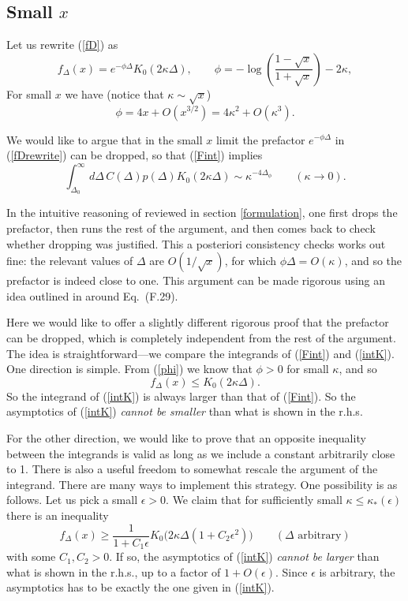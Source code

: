 \documentclass[12pt]{article}
\newcommand{\reef}[1]{(\ref{#1})}
\def\eps{\epsilon}
\newcommand{\beq}{\begin{equation}}
\newcommand{\eeq}{\end{equation}}
\def\ge{\geqslant}
\def\le{\leqslant}
\def\eps{\epsilon}
\newcommand{\D}{\Delta}
\numberwithin{equation}{section}
\begin{document}
\subsection{Small $x$}
\label{sec:smallx}
Let us rewrite \reef{fD} as
\beq
\label{fDrewrite}
f_\D(x) = e^{-\phi \D}K_0(2\kappa\D),\qquad
\phi=-\log\left(\frac{1-\sqrt{x}}{1+\sqrt{x}}\right)-2\kappa,
\eeq
For small $x$ we have (notice that $\kappa\sim\sqrt{x}$)
\beq\label{phi}
\phi=4x+O(x^{3/2})=4\kappa^2+O(\kappa^3).
\eeq

We would like to argue that in the small $x$ limit the prefactor $e^{-\phi \D}$ in \reef{fDrewrite} can be dropped, so that \reef{Fint} implies
\beq
\label{intK}
\int _{\D_0}^\infty d\D\,C(\D) p(\D)K_0(2\kappa\D) \sim \kappa^{-4\D_\phi}\qquad(\kappa\to 0).
\eeq

In the intuitive reasoning of \cite{Fitzpatrick:2012yx,Komargodski:2012ek} reviewed in section \ref{formulation}, one first drops the prefactor, then runs the rest of the argument, and then comes back to check whether dropping was justified. This a posteriori consistency checks works out fine: the relevant values of $\Delta$ are $O(1/\sqrt{x})$, for which $\phi \D=O(\kappa)$, and so the prefactor is indeed close to one. This argument can be made rigorous using an idea outlined in \cite{Fitzpatrick:2014vua} around Eq.~(F.29).

Here we would like to offer a slightly different rigorous proof that the prefactor can be dropped, which is completely independent from the rest of the argument. The idea is straightforward---we compare the integrands of \reef{Fint} and \reef{intK}. One direction is simple. From \reef{phi} we know that $\phi>0$ for small $\kappa$, and so
\beq
f_\D(x) \le K_0(2\kappa\D).
\eeq
So the integrand of \reef{intK} is always larger than that of \reef{Fint}. So the asymptotics of \reef{intK} \emph{cannot be smaller} than what is shown in the r.h.s.

For the other direction, we would like to prove that an opposite inequality between the integrands is valid as long as we include a constant arbitrarily close to 1. There is also a useful freedom to somewhat rescale the argument of the integrand. There are many ways to implement this strategy. One possibility is as follows. Let us pick a small $\eps>0$. We claim that for sufficiently small $\kappa\le \kappa_*(\eps)$ there is an inequality
\beq
f_\D(x) \ge \frac{1}{1+C_1 \eps} K_0\bigl(2\kappa\D(1+C_2 \eps^2)\bigr)\qquad(\Delta\text{ arbitrary})
\eeq
with some $C_1,C_2>0$. If so, the asymptotics of \reef{intK} \emph{cannot be larger} than what is shown in the r.h.s., up to a factor of $1+O(\eps)$. Since $\eps$ is arbitrary, the asymptotics has to be exactly the one given in \reef{intK}.
\end{document}
